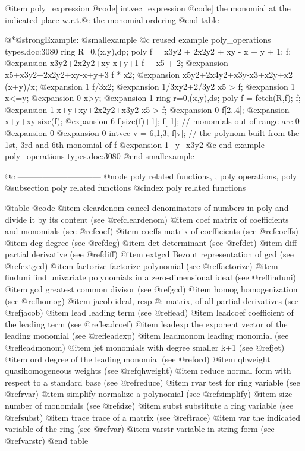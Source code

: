 {{{{{{@item poly_expression @code{[} intvec_expression @code{]}
the monomial at the indicated place w.r.t.@: the monomial ordering
@end table

@*@strong{Example:}
@smallexample
@c reused example poly_operations types.doc:3080 
  ring R=0,(x,y),dp;
  poly f = x3y2 + 2x2y2 + xy - x + y + 1;
  f;
@expansion{} x3y2+2x2y2+xy-x+y+1
  f + x5 + 2;
@expansion{} x5+x3y2+2x2y2+xy-x+y+3
  f * x2;
@expansion{} x5y2+2x4y2+x3y-x3+x2y+x2
  (x+y)/x;
@expansion{} 1
  f/3x2;
@expansion{} 1/3xy2+2/3y2
  x5 > f;
@expansion{} 1
  x<=y;
@expansion{} 0
  x>y;
@expansion{} 1
  ring r=0,(x,y),ds;
  poly f = fetch(R,f);
  f;
@expansion{} 1-x+y+xy+2x2y2+x3y2
  x5 > f;
@expansion{} 0
  f[2..4];
@expansion{} -x+y+xy
  size(f);
@expansion{} 6
  f[size(f)+1]; f[-1];    // monomials out of range are 0
@expansion{} 0
@expansion{} 0
  intvec v = 6,1,3;
  f[v];          // the polynom built from the 1st, 3rd and 6th monomial of f
@expansion{} 1+y+x3y2
@c end example poly_operations types.doc:3080
@end smallexample

@c ------------------------------
@node poly related functions,  , poly operations, poly
@subsection poly related functions
@cindex poly related functions

@table @code
@item cleardenom
cancel denominators of numbers in poly and divide it by its content
(see @ref{cleardenom})
@item coef
matrix of coefficients and monomials (see @ref{coef})
@item coeffs
matrix of coefficients (see @ref{coeffs})
@item deg
degree (see @ref{deg})
@item det
determinant (see @ref{det})
@item diff
partial derivative (see @ref{diff})
@item extgcd
Bezout representation of gcd (see @ref{extgcd})
@item factorize
factorize polynomial (see @ref{factorize})
@item finduni
find univariate polynomials in a zero-dimensional ideal (see @ref{finduni})
@item gcd
greatest common divisor (see @ref{gcd})
@item homog
homogenization (see @ref{homog})
@item jacob
ideal, resp.@: matrix, of all partial derivatives (see @ref{jacob})
@item lead
leading term (see @ref{lead})
@item leadcoef
coefficient of the leading term (see @ref{leadcoef})
@item leadexp
the exponent vector of the leading monomial (see @ref{leadexp})
@item leadmonom
leading monomial (see @ref{leadmonom})
@item jet
monomials with degree smaller k+1 (see @ref{jet})
@item ord
degree of the leading monomial (see @ref{ord})
@item qhweight
quasihomogeneous weights (see @ref{qhweight})
@item reduce
normal form with respect to a standard base (see @ref{reduce})
@item rvar
test for ring variable (see @ref{rvar})
@item simplify
normalize a polynomial (see @ref{simplify})
@item size
number of monomials (see @ref{size})
@item subst
substitute a ring variable (see @ref{subst})
@item trace
trace of a matrix (see @ref{trace})
@item var
the indicated variable of the ring (see @ref{var})
@item varstr
variable in string form (see @ref{varstr})
@end table

}}}}}}
